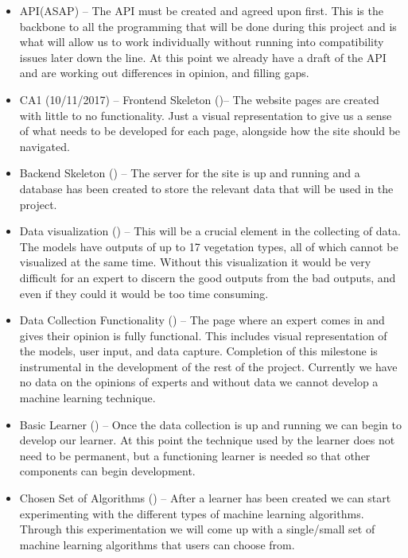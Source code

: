 \documentclass{ecmm427_assignment}
\begin{document}
\begin{itemize}

\item API(ASAP) – The API must be created and agreed upon first. This is the backbone to all the programming that will be done during this project and is what will allow us to work individually without running into compatibility issues later down the line. At this point we already have a draft of the API and are working out differences in opinion, and filling gaps.

\item CA1 (10/11/2017) – 
Frontend Skeleton ()– The website pages are created with little to no functionality. Just a visual representation to give us a sense of what needs to be developed for each page, alongside how the site should be navigated.

\item Backend Skeleton () –  The server for the site is up and running and a database has been created to store the relevant data that will be used in the project. 

\item Data visualization () –  This will be a crucial element in the collecting of data. The models have outputs of up to 17 vegetation types, all of which cannot be visualized at the same time. Without this visualization it would be very difficult for an expert to discern the good outputs from the bad outputs, and even if they could it would be too time consuming.

\item Data Collection Functionality () – The page where an expert comes in and gives their opinion is fully functional. This includes visual representation of the models, user input, and data capture. Completion of this milestone is instrumental in the development of the rest of the project. Currently we have no data on the opinions of experts and without data we cannot develop a machine learning technique.

\item Basic Learner () – Once the data collection is up and running we can begin to develop our learner. At this point the technique used by the learner does not need to be permanent, but a functioning learner is needed so that other components can begin development.

\item Chosen Set of Algorithms () – After a learner has been created we can start experimenting with the different types of machine learning algorithms. Through this experimentation we will come up with a single/small set of machine learning algorithms that users can choose from.


\end{itemize}
\end{document}
